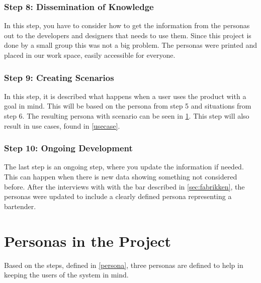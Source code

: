 \subsubsection{Step 8: Dissemination of Knowledge}
In this step, you have to consider how to get the information from the personas out to the developers and designers that needs to use them. Since this project is done by a small group this was not a big problem. The personas were printed and placed in our work space, easily accessible for everyone.

\subsubsection{Step 9: Creating Scenarios}
In this step, it is described what happens when a user uses the product with a goal in mind. This will be based on the persona from step 5 and situations from step 6. The resulting persona with scenario can be seen in \cref{akkpersona}. This step will also result in use cases, found in \cref{usecase}.

\subsubsection{Step 10: Ongoing Development}
The last step is an ongoing step, where you update the information if needed. This can happen when there is new data showing something not considered before. After the interviews with with the bar described in \cref{sec:fabrikken}, the personas were updated to include a clearly defined persona representing a bartender.

\section{Personas in the Project}
\label{akkpersona}

Based on the steps, defined in \cref{persona}, three personas are
defined to help in keeping the users of the system in mind.



